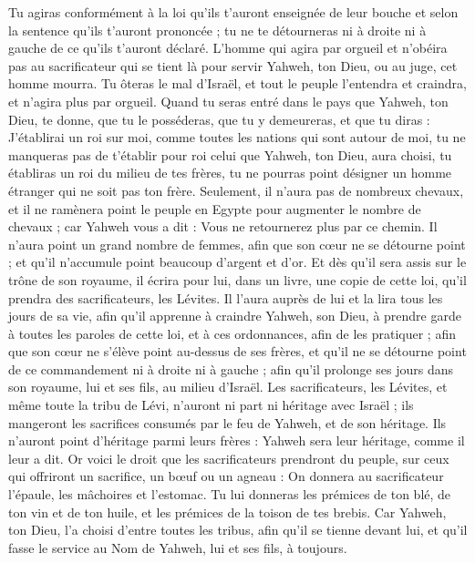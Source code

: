 \begin{multicols}{2}
Tu agiras conformément à la loi qu'ils t'auront enseignée de leur bouche et selon la sentence qu'ils t'auront prononcée ; tu ne te détourneras ni à droite ni à gauche de ce qu'ils t'auront déclaré.
L'homme qui agira par orgueil et n’obéira pas au sacrificateur qui se tient là pour servir Yahweh, ton Dieu, ou au juge, cet homme mourra. Tu ôteras le mal d'Israël,
et tout le peuple l'entendra et craindra, et n’agira plus par orgueil.
Quand tu seras entré dans le pays que Yahweh, ton Dieu, te donne, que tu le posséderas, que tu y demeureras, et que tu diras : J'établirai un roi sur moi, comme toutes les nations qui sont autour de moi,
tu ne manqueras pas de t'établir pour roi celui que Yahweh, ton Dieu, aura choisi, tu établiras un roi du milieu de tes frères, tu ne pourras point désigner un homme étranger qui ne soit pas ton frère.
Seulement, il n’aura pas de nombreux chevaux, et il ne ramènera point le peuple en Egypte pour augmenter le nombre de chevaux ; car Yahweh vous a dit : Vous ne retournerez plus par ce chemin.
Il n’aura point un grand nombre de femmes, afin que son cœur ne se détourne point ; et qu’il n’accumule point beaucoup d'argent et d’or.
Et dès qu'il sera assis sur le trône de son royaume, il écrira pour lui, dans un livre, une copie de cette loi, qu’il prendra des sacrificateurs, les Lévites.
Il l’aura auprès de lui et la lira tous les jours de sa vie, afin qu'il apprenne à craindre Yahweh, son Dieu, à prendre garde à toutes les paroles de cette loi, et à ces ordonnances, afin de les pratiquer ;
afin que son cœur ne s'élève point au-dessus de ses frères, et qu'il ne se détourne point de ce commandement ni à droite ni à gauche ; afin qu'il prolonge ses jours dans son royaume, lui et ses fils, au milieu d'Israël.
\VerseOne{}Les sacrificateurs, les Lévites, et même toute la tribu de Lévi, n'auront ni part ni héritage avec Israël ; ils mangeront les sacrifices consumés par le feu de Yahweh, et de son héritage.
Ils n'auront point d'héritage parmi leurs frères : Yahweh sera leur héritage, comme il leur a dit.
Or voici le droit que les sacrificateurs prendront du peuple, sur ceux qui offriront un sacrifice, un bœuf ou un agneau : On donnera au sacrificateur l'épaule, les mâchoires et l’estomac.
Tu lui donneras les prémices de ton blé, de ton vin et de ton huile, et les prémices de la toison de tes brebis.
Car Yahweh, ton Dieu, l’a choisi d'entre toutes les tribus, afin qu'il se tienne devant lui, et qu’il fasse le service au Nom de Yahweh, lui et ses fils, à toujours.

\end{multicols}
